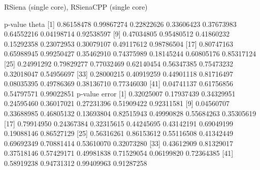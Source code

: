 \documentclass[]{beamer}                                                %
\begin{document}
\begin{frame}[fragile]                                                  %
  \begin{semiverbatim}\tiny
RSiena (single core), RSienaCPP (single core)

p-value theta
 [1] 0.86158478 0.99867274 0.22822626 0.33606423 0.37673983 0.64552216 0.04198714 0.92538597
 [9] 0.47034805 0.95480512 0.41860232 0.15292358 0.23072953 0.30079107 0.49117612 0.98786504
[17] 0.80747163 0.65988945 0.99250427 0.35462910 0.74375989 0.18145244 0.60805176 0.85317124
[25] 0.24991292 0.79829277 0.77032469 0.62140454 0.56347385 0.75473232 0.32018047 0.54956697
[33] 0.28000215 0.40919259 0.44901118 0.81716497 0.08035395 0.49786369 0.38136710 0.77346030
[41] 0.04741137 0.61756856 0.54797571 0.99022851
p-value error
 [1] 0.32025007 0.17937439 0.34329951 0.24595460 0.36017021 0.27231396 0.51909422 0.92311581
 [9] 0.04560707 0.33688985 0.46805132 0.13693804 0.82515943 0.49990828 0.55684263 0.35305619
[17] 0.79914950 0.24367384 0.32315615 0.44245695 0.43142191 0.69049199 0.19088146 0.86527129
[25] 0.56316261 0.86153612 0.55116508 0.41342449 0.69692349 0.70881414 0.53610070 0.32073280
[33] 0.43612909 0.81329017 0.37518146 0.57429171 0.49981838 0.71529054 0.06199820 0.72364385
[41] 0.58919238 0.94731312 0.99409963 0.91287258
  \end{semiverbatim}
\end{frame}
\end{document}
